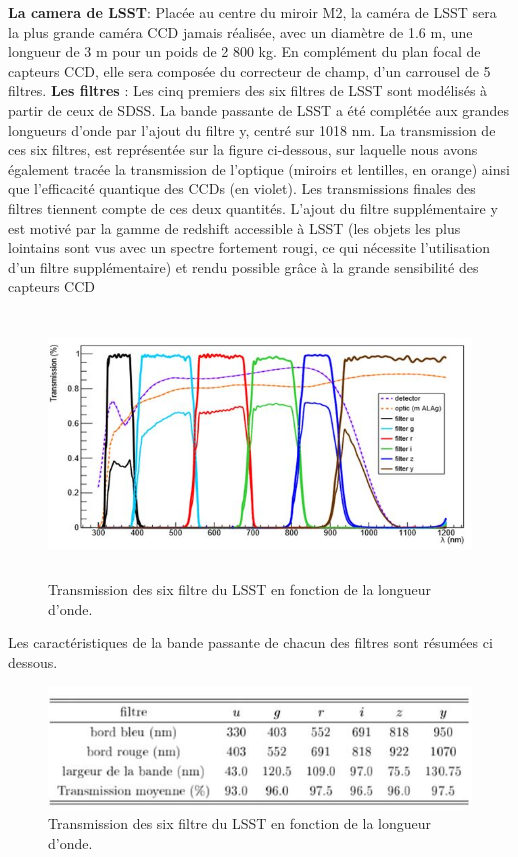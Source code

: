 \textbf{La camera de LSST}: Placée au centre du miroir M2, la caméra de LSST sera la plus grande caméra CCD jamais réalisée, avec un diamètre de 1.6 m, une longueur de 3 m pour un poids de 2 800 kg. En complément du plan focal de capteurs CCD, elle sera composée du correcteur de champ, d'un carrousel de 5 filtres.
\newline
\textbf{Les filtres }: Les cinq premiers des six filtres de LSST sont modélisés à partir de ceux de SDSS. La bande passante de LSST a été complétée aux grandes longueurs d'onde par l'ajout du filtre y, centré sur 1018 nm. La transmission de ces six filtres, est représentée sur la figure ci-dessous, sur laquelle nous avons également tracée la transmission de l'optique (miroirs et lentilles, en orange) ainsi que l'efficacité quantique des CCDs (en violet). Les transmissions finales des filtres tiennent compte de ces deux quantités. L'ajout du filtre supplémentaire y est motivé par la gamme de redshift accessible à LSST (les objets les plus lointains sont vus avec un spectre fortement rougi, ce qui nécessite l'utilisation d'un filtre supplémentaire) et rendu possible grâce à la grande sensibilité des capteurs CCD
\newline
\begin{figure}[!h]
    \centering
    \includegraphics[width=12cm,height=7cm]{report/figures/filtre1.JPG}
    \caption{Transmission des six filtre du LSST en fonction de la longueur d'onde.}
    \label{fig:modeling_shema}
\end{figure}
\newline
Les caractéristiques de la bande passante de chacun des filtres sont résumées ci dessous.
\begin{figure}[!h]
    \centering
    \includegraphics{report/figures/filtre2.JPG}
    \caption{Transmission des six filtre du LSST en fonction de la longueur d'onde.}
    \label{fig:modeling_shema}
\end{figure}


